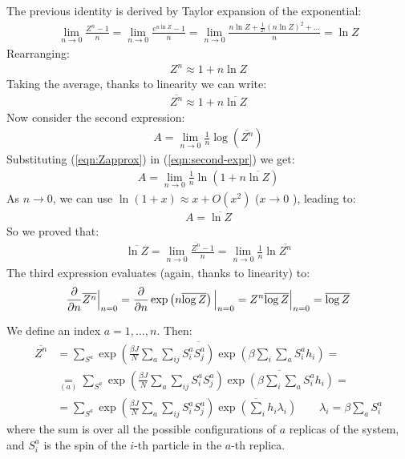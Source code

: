 \documentclass[../template.tex]{subfiles}
\begin{document}
\begin{expl}
    The previous identity is derived by Taylor expansion of the exponential:
    \begin{align*}
        \lim_{n \to 0} \frac{Z^n -1}{n} = \lim_{n \to 0} \frac{e^{n \ln Z} - 1}{n} = \lim_{n \to 0} \frac{n \ln Z + \frac{1}{2!} (n \ln Z)^2 + \dots }{n} = \ln Z 
    \end{align*}
    Rearranging:
    \begin{align*}
        Z^n \approx 1+ n \ln Z
    \end{align*}
    Taking the average, thanks to linearity we can write:
    \begin{align}
        \overline{Z^n} \approx 1+n\overline{\ln Z} 
        \label{eqn:Zapprox}
    \end{align}
    Now consider the second expression:
    \begin{align}
        A = \lim_{n \to 0}\frac{1}{n} \log(\overline{Z^n}) 
        \label{eqn:second-expr}
    \end{align}
    Substituting (\ref{eqn:Zapprox}) in (\ref{eqn:second-expr}) we get:
    \begin{align*}
        A = \lim_{n \to 0} \frac{1}{n} \ln (1+ n \overline{\ln Z}) 
    \end{align*}
    As $n \to 0$, we can use $\ln(1+x) \approx x + O(x^2)$ ($x \to 0$ ), leading to:
    \begin{align*}
     A = \overline{\ln Z}   
    \end{align*}   
    So we proved that:
    \begin{align*}
        \overline{\ln Z} = \lim_{n \to 0} \frac{\overline{Z^n} -1}{n} = \lim_{n \to  0} \frac{1}{n} \ln \overline{Z^n}  
    \end{align*}
    The third expression evaluates (again, thanks to linearity) to:
    \begin{align*}
        \pdv{n} \overline{Z^n} \Big|_{n = 0} = \pdv{n} \exp\left(n \overline{\log Z}\right)\Big|_{n = 0} = Z^n \overline{\log Z} \Big|_{n = 0} = \overline{\log Z}
    \end{align*}
\end{expl}

We define an index $a = 1, \dots, n$. Then:
\begin{align*}
    \overline{Z^n} &= \overline{\sum_{S^a} \exp\left(\frac{\beta J}{N} \sum_a \sum_{ij} S_i^a S_j^a\right) \exp \left(\beta \sum_i \sum_a S_i^a h_i\right)} =\\
    &\underset{(a)}{=}  \sum_{S^a} \exp\left(\frac{\beta J}{N} \sum_a \sum_{ij} S_i^a S_j^a\right) \overline{\exp \left(\beta \sum_i \sum_a S_i^a h_i\right)} = \\
    &= \sum_{S^a} \exp\left(\frac{\beta J}{N} \sum_a \sum_{ij} S_i^a S_j^a \right) \overline{\exp\left(\sum_i h_i \lambda_i \right)} \qquad \lambda_i = \beta \sum_a S_i^a
\end{align*} 
where the sum is over all the possible configurations of $a$ replicas of the system, and $S_i^a$ is the spin of the $i$-th particle in the $a$-th replica. 
\end{document}
